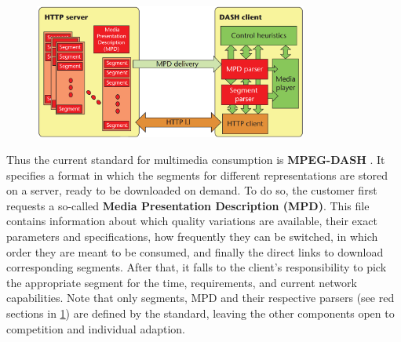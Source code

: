   \begin{figure}[ht]
  	\centering
  	\includegraphics[width=0.8\textwidth]{figures/DASH_scope.png}
  	\label{fig:dash:DASH_scope}
  \end{figure}

Thus the current standard for multimedia consumption is \textbf{MPEG-DASH} \cite{Soda11}. It specifies a format in which the segments for different representations are stored on a server, ready to be downloaded on demand. To do so, the customer first requests a so-called \textbf{Media Presentation Description (MPD)}. This file contains information about which quality variations are available, their exact parameters and specifications, how frequently they can be switched, in which order they are meant to be consumed, and finally the direct links to download corresponding segments. After that, it falls to the client's responsibility to pick the appropriate segment for the time, requirements, and current network capabilities. Note that only segments, MPD and their respective parsers (see red sections in \ref{fig:dash:DASH_scope}) are defined by the standard, leaving the other components open to competition and individual adaption.


